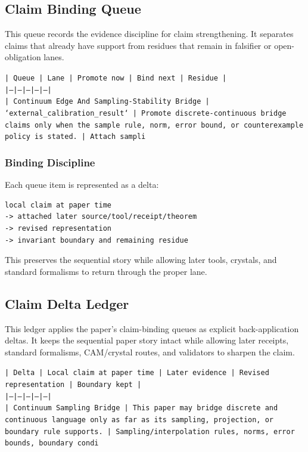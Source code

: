 \documentclass[11pt]{article}
\begin{document}
\subsection*{Claim Binding Queue}

This queue records the evidence discipline for claim strengthening. It separates claims that already have support from residues that remain in falsifier or open-obligation lanes.

\noindent\texttt{| Queue | Lane | Promote now | Bind next | Residue |}\\
\noindent\texttt{|---|---|---|---|---|}\\
\noindent\texttt{| Continuum Edge And Sampling-Stability Bridge | `external\_calibration\_result` | Promote discrete-continuous bridge claims only when the sample rule, norm, error bound, or counterexample policy is stated. | Attach sampli}\\

\subsubsection*{Binding Discipline}

Each queue item is represented as a delta:

\begin{verbatim}
local claim at paper time
-> attached later source/tool/receipt/theorem
-> revised representation
-> invariant boundary and remaining residue
\end{verbatim}

This preserves the sequential story while allowing later tools, crystals, and
standard formalisms to return through the proper lane.

\subsection*{Claim Delta Ledger}

This ledger applies the paper's claim-binding queues as explicit back-application
deltas. It keeps the sequential paper story intact while allowing later
receipts, standard formalisms, CAM/crystal routes, and validators to sharpen the
claim.

\noindent\texttt{| Delta | Local claim at paper time | Later evidence | Revised representation | Boundary kept |}\\
\noindent\texttt{|---|---|---|---|---|}\\
\noindent\texttt{| Continuum Sampling Bridge | This paper may bridge discrete and continuous language only as far as its sampling, projection, or boundary rule supports. | Sampling/interpolation rules, norms, error bounds, boundary condi}\\
\end{document}
